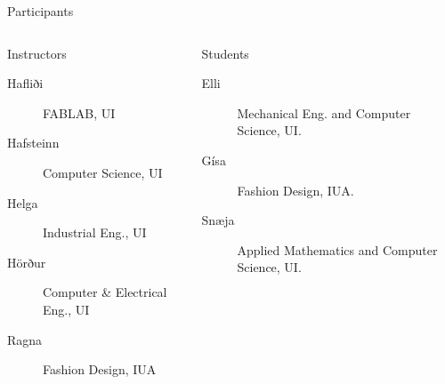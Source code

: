 \documentclass[
    NAME={Dr. Helga Ingimundardóttir},
    EMAIL={helgaingim@hi.is},
    FACULTY={Industrial Engineering},
    TITLE={HiDef Textiles: Reviving Tradition with Innovation},
    SUBTITLE={Empowering Creativity and Sustainability in Textile Production through Digital Transformation},
    SEMINAR={Reykjavík DataBeers},
    DATE={January 25, 2025},
    WIDE={true}
]{HI-LaTeX/hi-beamer}
\begin{document}
    \begin{frame}[allowframebreaks]{Participants}
        \begin{columns}
            \begin{column}{0.42\linewidth}
                \begin{block}{Instructors}
                    \begin{description}
                        \item[Hafliði] FABLAB, UI
                        \item[Hafsteinn] Computer Science, UI
                        \item[Helga] Industrial Eng., UI
                        \item[Hörður] Computer \& Electrical Eng., UI
                        \item[Ragna] Fashion Design, IUA
                    \end{description}
                \end{block}
            \end{column}

            \begin{column}{0.45\linewidth}
                \begin{block}{Students}
                    \begin{description}
                        \item[Elli] Mechanical Eng. and Computer Science, UI.
                        \item[Gísa] Fashion Design, IUA.
                        \item[Snæja] Applied Mathematics and Computer Science, UI.
                    \end{description}
                \end{block}
            \end{column}
        \end{columns}

        \framebreak


\end{frame}
\end{document}
